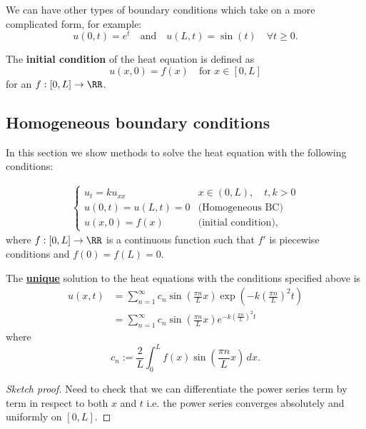 \documentclass[12pt, a4paper]{article}
\begin{document}
\begin{mdremark}
    We can have other types of boundary conditions which take on a more complicated form, for example:
    \[u(0,t) = e^t \quad \text{and} \quad u(L,t)=\sin(t) \quad \forall t\geq 0.\]
\end{mdremark}

\begin{definition}
    The \textbf{initial condition} of the heat equation is defined as 
    \[u(x,0)=f(x) \quad \text{for } x \in [0,L]\]
    for an \(f : [0,L] \to \RR\).
\end{definition}

\subsection{Homogeneous boundary conditions}

In this section we show methods to solve the heat equation with the following conditions:

\[\begin{aligned}
    \begin{cases}
        u_t = ku_{xx} & x \in (0,L), \quad t,k>0 \\
        u(0,t)=u(L,t)=0 & \text{(Homogeneous BC)} \\
        u(x,0)=f(x) & \text{(initial condition)},
    \end{cases}
\end{aligned}\]
where \(f:[0,L] \to \RR\) is a continuous function such that \(f'\) is piecewise conditions and \(f(0)=f(L)=0\).

\begin{mdthm}
    The \underline{\textbf{unique}} solution to the heat equations with the conditions specified above is 
    \[\begin{aligned}
        u(x,t) &= \sum_{n=1}^{\infty} c_n \sin\left( \frac{\pi n}{L} x \right)\exp\left( -k\left( \frac{\pi n}{L} \right)^2t \right) \\
        &=\sum_{n=1}^{\infty} c_n \sin\left( \frac{\pi n}{L} x \right) e^{-k\left( \frac{\pi n}{L} \right)^2 t}
    \end{aligned}\]
    where 
    \[c_n := \frac{2}{L} \int_{0}^{L} f(x) \sin\left( \frac{\pi n}{L} x \right) \, dx.\]
\end{mdthm}

\begin{proof}[Sketch proof]
    Need to check that we can differentiate the power series term by term in respect to both \(x\) and \(t\) i.e. the power series converges absolutely and uniformly on \([0,L]\).
\end{proof}
\end{document}
